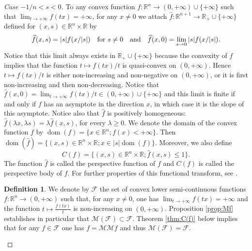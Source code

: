 \documentclass[10pt]{amsart}
\theoremstyle{definition}
\newtheorem{defi}[thm]{Definition}
\theoremstyle{remark}
\newcommand{\R}{\mathbb{R}}
\newcommand{\M}{\mathcal{M}}
\newcommand{\F}{\mathcal{F}}
\newcommand{\f}{\widehat{f}}
\newcommand{\dom}{\operatorname{dom}}
\begin{document}
\begin{proof}[Case $-1/n<s< 0$]
To any convex function $f:\R^n\to(0,+\infty)\cup\{+\infty\}$  such that $\lim_{t\to+\infty}f(tx)=+\infty$, for any $x\neq0$ we attach $\f:\R^{n+1}\to\R_+\cup\{+\infty\}$ defined for $(x,s)\in\R^n\times\R$ by 
\[
\f(x,s)=|s|f(x/|s|)\quad\hbox{for}\ s\neq0\quad \hbox{and}\quad \f(x,0)=\lim_{s\to0}|s|f(x/|s|).
\]
Notice that this limit always exists in $\R_+\cup\{+\infty\}$ because the convexity of $f$ implies that the function $t\mapsto f(tx)/t$ is quasi-convex on $(0,+\infty)$. Hence $t\mapsto f(tx)/t$ is either non-increasing and non-negative on $(0,+\infty)$, or it is first non-increasing and then non-decreasing. Notice that $\f(x,0)=\lim_{t\to+\infty}f(tx)/t\in(0,+\infty)\cup\{+\infty\}$ and this limit is finite if and only if $f$ has an asymptote in the direction $x$, in which case it is the slope of this asymptote. Notice also that $\f$ is positively homogeneous: $\f(\lambda x,\lambda s)=\lambda \f(x,s)$, for every $\lambda \ge0$. We denote the domain of the convex function $f$ by $\dom(f)=\{x\in\R^n; f(x)<+\infty\}$. Then $\dom(\f)=\{(x,s)\in\R^n\times\R; x\in |s|\dom(f)\}$. Moreover, we also define  
\[
C(f)=\{(x,s)\in\R^n\times\R; \f(x,s)\le1\}.
\]
The function $\f$ is called the perspective function of $f$ and $C(f)$ is called the perspective body of $f$. For further properties of this functional transform, see \cite{AAFM12}.

\begin{defi}\label{rk:var-rate}
We denote by $\F$  the set of convex lower semi-continuous functions $f:\R^n\to(0,+\infty)$ such that, for any $x\neq0$, one has $\lim_{t\to+\infty}f(tx)=+\infty$ and the function $t\mapsto\frac{f(tx)}{t}$ is non-increasing on $(0,+\infty)$. Proposition \ref{prop:Mf} establishes in particular that $\M(\F)\subset\F$. Theorem \ref{thm:C(f)} below implies that for any $f\in\F$ one has $f=\M\M f$ and thus $\M(\F)=\F$.
\end{defi}


\end{proof}
\end{document}
